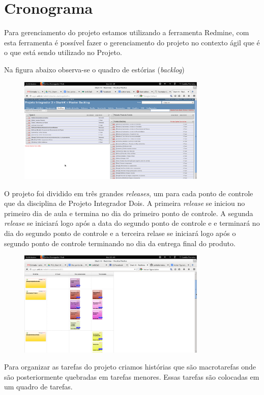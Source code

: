 \chapter[Cronograma]{Cronograma}
Para gerenciamento do projeto estamos utilizando a ferramenta Redmine, com esta ferramenta é possível fazer o gerenciamento do projeto no contexto ágil que é o que está sendo utilizado no Projeto.

Na figura abaixo observa-se o quadro de estórias (\textit{backlog})
\begin{figure}[h]
  \centering
  \includegraphics[width=0.8\textwidth]
      {figuras/backlogs.eps}
  \caption[redmine-\textit{backlog}]
  \label{Redmine e \textit{backlog} do projeto}
\end{figure}

O projeto foi dividido em três grandes \textit{releases}, um para cada ponto de controle que da disciplina de Projeto Integrador Dois. A primeira \textit{release} se iniciou no primeiro dia de aula e termina no dia do primeiro ponto de controle. A segunda \textit{release} se iniciará logo após a data do segundo ponto de controle e e terminará no dia do segundo ponto de controle e a terceira relase se iniciará logo após o segundo ponto de controle terminando no dia da entrega final do produto.

\begin{figure}[h]
  \centering
  \includegraphics[width=0.8\textwidth]
      {figuras/quadrotarefas.eps}
  \caption[quadro-de-tarefas]
  \label{Quadro de tarefas}
\end{figure}
Para organizar as tarefas do projeto criamos histórias que são macrotarefas onde são posteriormente quebradas em tarefas menores. Essas tarefas são colocadas em um quadro de tarefas.


  
